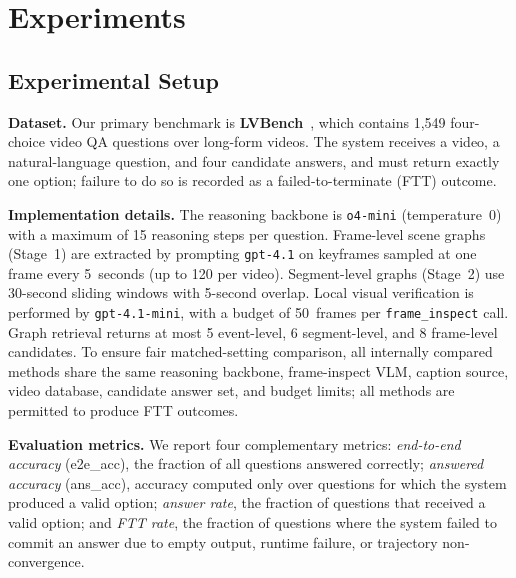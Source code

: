 \documentclass[sigconf, screen, review, anonymous]{acmart}
\begin{document}
\section{Experiments}
\label{sec:experiments}



\subsection{Experimental Setup}
\label{sec:setup}

\textbf{Dataset.}\quad
Our primary benchmark is \textbf{LVBench}~\cite{lvbench}, which contains
1{,}549 four-choice video QA questions over long-form videos.  The system
receives a video, a natural-language question, and four candidate answers,
and must return exactly one option; failure to do so is recorded as
a failed-to-terminate (FTT) outcome.

\textbf{Implementation details.}\quad
The reasoning backbone is \texttt{o4-mini} (temperature~0) with a maximum
of 15 reasoning steps per question.  Frame-level scene graphs (Stage~1)
are extracted by prompting \texttt{gpt-4.1} on keyframes sampled at one
frame every 5~seconds (up to 120 per video).  Segment-level graphs
(Stage~2) use 30-second sliding windows with 5-second overlap.  Local
visual verification is performed by \texttt{gpt-4.1-mini}, with a budget
of 50~frames per \texttt{frame\_inspect} call.  Graph retrieval returns at
most 5 event-level, 6 segment-level, and 8 frame-level candidates.  To
ensure fair matched-setting comparison, all internally compared methods
share the same reasoning backbone, frame-inspect VLM, caption source,
video database, candidate answer set, and budget limits; all methods are
permitted to produce FTT outcomes.

\textbf{Evaluation metrics.}\quad
We report four complementary metrics: \emph{end-to-end accuracy}
(e2e\_acc), the fraction of all questions answered correctly;
\emph{answered accuracy} (ans\_acc), accuracy computed only over questions
for which the system produced a valid option; \emph{answer rate}, the
fraction of questions that received a valid option; and \emph{FTT rate}, the fraction of questions where the system failed
to commit an answer due to empty output, runtime failure, or trajectory
non-convergence.


\end{document}
